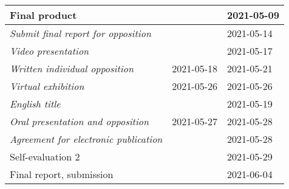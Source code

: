 \begin{center}
\begin{tabular}{|l|l|l|}
        {Final product}                                 &               & 2021-05-09    \\ \hline
        \textit{Submit final report for opposition}     &               & 2021-05-14    \\ \hline
        \textit{Video presentation}                     &               & 2021-05-17    \\ \hline
        \textit{Written individual opposition}          & 2021-05-18    & 2021-05-21    \\ \hline
        \textit{Virtual exhibition}                     & 2021-05-26    & 2021-05-26    \\ \hline
        \textit{English title}                          &               & 2021-05-19    \\ \hline
        \textit{Oral presentation and opposition}       & 2021-05-27    & 2021-05-28    \\ \hline
        \textit{Agreement for electronic publication}   &               & 2021-05-28    \\ \hline
        Self-evaluation 2                               &               & 2021-05-29    \\ \hline
        Final report, submission                        &               & 2021-06-04    \\ \hline
    \end{tabular}
\end{center}